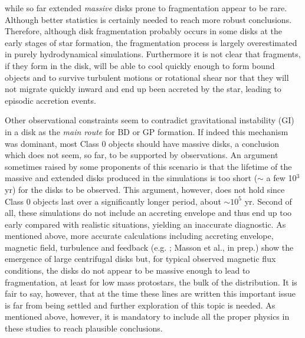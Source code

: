 while so far extended {\it massive} disks prone to fragmentation appear to be rare. Although better statistics is certainly needed to reach more robust conclusions.
Therefore, although disk fragmentation probably occurs in some disks at the early stages of star formation, 
the fragmentation process is largely overestimated in purely hydrodynamical simulations. Furthermore it is not clear
that fragments, if they form in the disk, will be able to cool quickly enough to form bound objects and to survive turbulent motions or rotational shear nor that they will not migrate quickly inward and end up been accreted by the star, leading to
episodic accretion events.

Other observational constraints seem to contradict gravitational instability (GI) in a disk as the {\it main route} for
BD or GP formation. If indeed this mechanism was dominant, most Class 0 objects should have massive disks, a conclusion which does not seem, 
so far, to be supported by observations. An argument sometimes raised by some proponents of this scenario \citep[e.g.][]{Stamatellos2009} is that the lifetime of the massive and extended disks produced in the simulations is too short ($\sim$ a few 10$^3$ yr) for the disks to be observed. This argument, however, does not hold since Class 0 objects last over a significantly longer period, about $\sim 10^5$ yr.
Second of all, these simulations do not include an accreting envelope and thus end up too early compared with realistic situations, yielding an inaccurate diagnostic. 
As mentioned above, more accurate calculations including accreting envelope, magnetic field, turbulence and feedback (e.g. \citet{Seifried2013}; Masson et al., in prep.) show the emergence of large centrifugal disks but, for typical observed magnetic flux conditions, the disks do not appear to be massive enough to lead to fragmentation, at least for low mass protostars, the bulk of the
distribution. It is fair to say, however, that at the time these lines are written this important issue is far from being settled and further exploration of this topic is needed. As mentioned above, however,
it is mandatory to include all the proper physics in these studies to reach plausible conclusions. 

